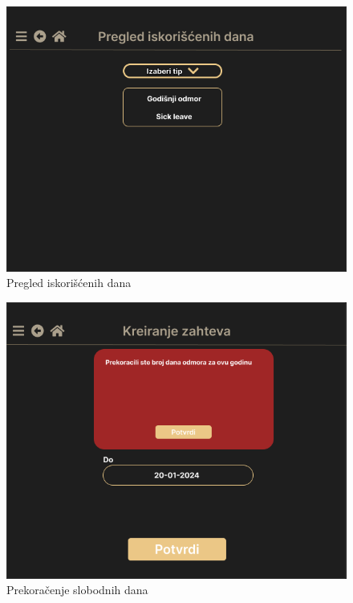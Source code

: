 \documentclass[a4paper]{article}
\begin{document}
\begin{figure} [!ht]
    \begin{center}
        \includegraphics[scale=0.25]{UI/Zaposleni/PregledIskoricenihDana.png}
    \end{center}
\caption{Pregled iskorišćenih dana}
\end{figure}

\begin{figure} [!ht]
    \begin{center}
        \includegraphics[scale=0.25]{UI/Zaposleni/Prekoracenje.png}
    \end{center}
\caption{Prekoračenje slobodnih dana}
\end{figure}
\end{document}
